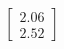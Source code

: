 \documentclass[preview]{standalone}
\begin{document}
\begin{align*}
\begin{bmatrix} 2.06 \\ 2.52 \end{bmatrix}
\end{align*}
\end{document}
